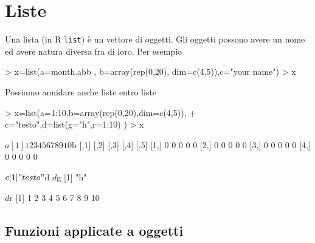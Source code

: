 \documentclass[onecolumn,11pt]{book}
\begin{document}
\section{Liste}
Una lista (in \textsf{R} \texttt{list}) \`e un vettore di oggetti.  Gli oggetti possono avere un nome ed avere natura diversa fra di loro. 
Per esempio
\begin{Schunk}
\begin{Sinput}
> x=list(a=month.abb , b=array(rep(0,20), dim=c(4,5)),c="your name")
> x
\end{Sinput}
\end{Schunk}
Possiamo annidare anche liste entro liste
\begin{Schunk}
\begin{Sinput}
> x=list(a=1:10,b=array(rep(0,20),dim=c(4,5)),
+ c="testo",d=list(g="h",r=1:10) )
> x
\end{Sinput}
\begin{Soutput}
$a
 [1]  1  2  3  4  5  6  7  8  9 10

$b
     [,1] [,2] [,3] [,4] [,5]
[1,]    0    0    0    0    0
[2,]    0    0    0    0    0
[3,]    0    0    0    0    0
[4,]    0    0    0    0    0

$c
[1] "testo"

$d
$d$g
[1] "h"

$d$r
 [1]  1  2  3  4  5  6  7  8  9 10
\end{Soutput}
\end{Schunk}
\subsection{Funzioni applicate a oggetti}
\end{document}
